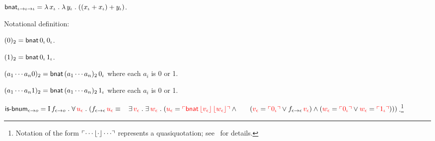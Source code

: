 \documentclass[fleqn]{llncs}
\begin{document}
\begin{biformthy}
    \setcounter{enumi}{2}

    \iffalse
    \item $\mname{IS-FO-BT1}_{\epsilon \tarrow \epsilon} = \LambdaApp
      x_\epsilon \mdot \textbf{B}_\epsilon$ {\sglsp} where
      $\textbf{B}_\epsilon$ is a complex expression such that
      $\syn{(\LambdaApp x_\epsilon \mdot \textbf{B}_\epsilon) \,
        \synbrack{\textbf{A}_\alpha}}$ equals $\syn{\synbrack{T_o}}$
      [$\syn{\synbrack{F_o}}$] if $\textbf{A}_\alpha$ is [not] a term
      or formula of first-order logic with equality whose variables
      are of type $\iota$ and whose nonlogical constants are members
      of $\set{0_\iota,S_{\iota \tarrow \iota}}$.  \fi

    \item $\mbox{\sf bnat}_{\iota \rightarrow \iota \rightarrow \iota} =
      \lambda\, x_\iota \mathrel. \lambda\, y_\iota \mathrel. ((x_\iota +
      x_\iota) + y_\iota)$.
      
    Notational definition:

    \bi

      \item[] $(0)_2 = \mbox{\sf bnat} \, 0_\iota \, 0_\iota$.
  
      \item[] $(1)_2 = \mbox{\sf bnat} \, 0_\iota \, 1_\iota$.
  
      \item[] $(a_1 \cdots a_n0)_2 = \mbox{\sf bnat} \, (a_1 \cdots
        a_n)_2 \, 0_\iota$ {\sglsp} where each $a_i$ is 0 or 1.
  
      \item[] $(a_1 \cdots a_n1)_2 = \mbox{\sf bnat} \, (a_1 \cdots
        a_n)_2 \, 1_\iota$ {\sglsp} where each $a_i$ is 0 or 1.
  
    \ei

    \item $\mbox{\sf is-bnum}_{\epsilon \rightarrow o} = 
      \mbox{\rm I}\, f_{\epsilon \rightarrow o} \mathrel.
      \forall\, \textcolor{red}{u_\epsilon} \mathrel.
      (f_{\epsilon \rightarrow \epsilon} \, \textcolor{red}{u_\epsilon} \equiv {}\\
      \hspace*{2ex}\exists\, \textcolor{red}{v_\epsilon} \mathrel. 
      \exists\, \textcolor{red}{w_\epsilon} \mathrel.
      (\textcolor{red}{u_\epsilon} = \textcolor{red}{\ulcorner\mbox{\sf bnat} \, 
      \lfloor v_\epsilon\rfloor \, \lfloor w_\epsilon\rfloor\urcorner} \wedge {}\\
      \hspace*{4ex}(\textcolor{red}{v_\epsilon} = \textcolor{red}{\ulcorner0_\iota\urcorner} \vee
      f_{\epsilon \rightarrow \epsilon} \, \textcolor{red}{v_\epsilon}) \wedge
      (\textcolor{red}{w_\epsilon} = \textcolor{red}{\ulcorner0_\iota\urcorner} \vee
      \textcolor{red}{w_\epsilon} =
      \textcolor{red}{\ulcorner1_\iota\urcorner})))$.\footnote{Notation of the form
        $\ulcorner\cdots\lfloor\cdot\rfloor\cdots\urcorner$ represents a
        quasiquotation; see~\cite{FarmerArxiv16} for details.}


\end{biformthy}
\end{document}

